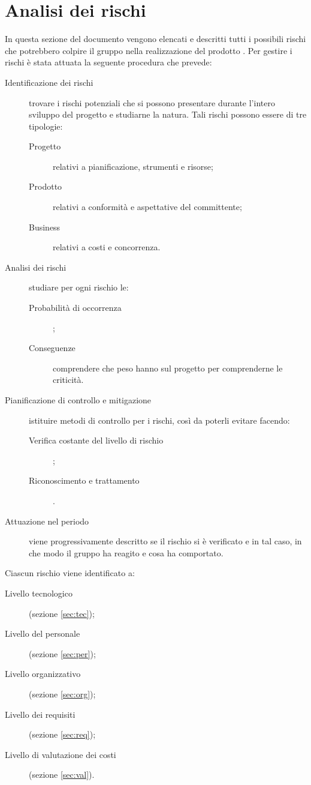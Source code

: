 \section{Analisi dei rischi} \label{sec:analisi}
In questa sezione del documento vengono elencati e descritti tutti i possibili rischi che potrebbero colpire il gruppo \hx{} nella realizzazione del prodotto \proj. Per gestire i rischi è stata attuata la seguente procedura che prevede:
\begin{description}
	\item[Identificazione dei rischi] trovare i rischi potenziali che si possono presentare durante l'intero sviluppo del progetto e studiarne la natura. Tali rischi possono essere di tre tipologie:
	\begin{description}
		\item[Progetto] relativi a pianificazione, strumenti e risorse;
		\item[Prodotto] relativi a conformità e aspettative del committente;
		\item[Business] relativi a costi e concorrenza.
	\end{description}
	\item[Analisi dei rischi] studiare per ogni rischio le:
	\begin{description}
		\item[Probabilità di occorrenza];
		\item[Conseguenze] comprendere che peso hanno sul progetto per comprenderne le criticità.
	\end{description}
	\item[Pianificazione di controllo e mitigazione] istituire metodi di controllo per i rischi, così da poterli evitare facendo:
	\begin{description}
		\item[Verifica costante del livello di rischio];
		\item[Riconoscimento e trattamento].
	\end{description}
	\item[Attuazione nel periodo] viene progressivamente descritto se il rischio si è verificato e in tal caso, in che modo il gruppo ha reagito e cosa ha comportato.
\end{description}
Ciascun rischio viene identificato a:
\begin{description}
	\item[Livello tecnologico](sezione \ref{sec:tec});
	\item[Livello del personale](sezione \ref{sec:per});
	\item[Livello organizzativo](sezione \ref{sec:org});
	\item[Livello dei requisiti](sezione \ref{sec:req});
	\item[Livello di valutazione dei costi](sezione \ref{sec:val}).
\end{description}
